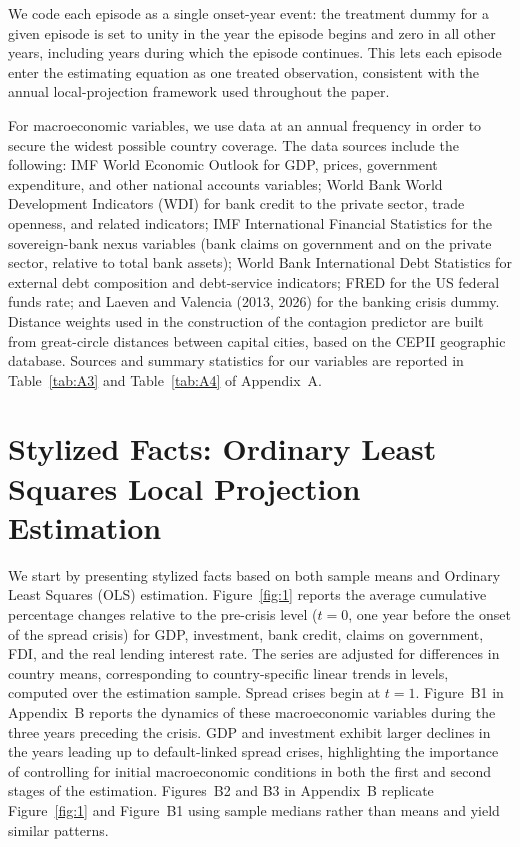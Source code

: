 \documentclass[12pt]{article}
\begin{document}
We code each episode as a single onset-year event: the treatment dummy
for a given episode is set to unity in the year the episode begins and
zero in all other years, including years during which the episode
continues. This lets each episode enter the estimating equation as one
treated observation, consistent with the annual local-projection
framework used throughout the paper.

For macroeconomic variables, we use data at an annual frequency in order
to secure the widest possible country coverage. The data sources include
the following: IMF World Economic Outlook for GDP, prices, government
expenditure, and other national accounts variables; World Bank World
Development Indicators (WDI) for bank credit to the private sector, trade
openness, and related indicators; IMF International Financial Statistics
for the sovereign-bank nexus variables (bank claims on government and on
the private sector, relative to total bank assets); World Bank
International Debt Statistics for external debt composition and
debt-service indicators; FRED for the US federal funds rate; and Laeven
and Valencia (2013, 2026) for the banking crisis dummy. Distance weights
used in the construction of the contagion predictor are built from
great-circle distances between capital cities, based on the CEPII
geographic database. Sources and summary statistics for our variables are
reported in Table~\ref{tab:A3} and Table~\ref{tab:A4} of Appendix~A.

\section{Stylized Facts: Ordinary Least Squares Local Projection Estimation}

We start by presenting stylized facts based on both sample means and
Ordinary Least Squares (OLS) estimation. Figure~\ref{fig:1} reports the
average cumulative percentage changes relative to the pre-crisis level
($t=0$, one year before the onset of the spread crisis) for GDP,
investment, bank credit, claims on government, FDI, and the real lending
interest rate. The series are adjusted for differences in country means,
corresponding to country-specific linear trends in levels, computed over
the estimation sample. Spread crises begin at $t=1$. Figure~B1 in
Appendix~B reports the dynamics of these macroeconomic variables during
the three years preceding the crisis. GDP and investment exhibit larger
declines in the years leading up to default-linked spread crises,
highlighting the importance of controlling for initial macroeconomic
conditions in both the first and second stages of the estimation.
Figures~B2 and B3 in Appendix~B replicate Figure~\ref{fig:1} and Figure~B1
using sample medians rather than means and yield similar patterns.
\end{document}
